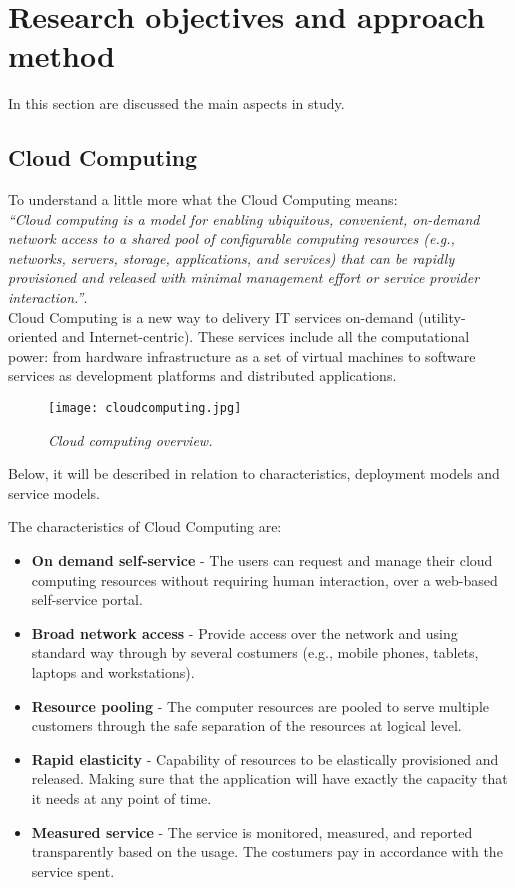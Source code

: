 \newpage
\section{Research objectives and approach method}

In this section are discussed the main aspects in study.

\subsection{Cloud Computing}



To understand a little more what the Cloud Computing means:\\

\textit{``Cloud computing is a model for enabling ubiquitous, convenient, on-demand network access to a shared pool of configurable computing resources (e.g., networks, servers, storage, applications, and services) that can be rapidly provisioned and released with minimal management effort or service provider interaction.''}\cite{mell2011nist}.\\

Cloud Computing is a new way to delivery IT services on-demand (utility-oriented and Internet-centric). These services include all the computational power: from hardware infrastructure as a set of virtual machines to software services as development platforms and distributed applications.

\begin{figure}[!ht]
\begin{center}
\texttt{[image: cloudcomputing.jpg]}
\caption{\small \sl Cloud computing overview.\label{fig:cloudcomputing}}
\end{center}
\end{figure}

Below, it will be described in relation to characteristics, deployment models and service models\cite{schouten2013ibm}.

The characteristics of Cloud Computing are:
\begin{itemize}
	\item \textbf{On demand self-service} 	- The users can request and manage their cloud computing resources without requiring human interaction, over a web-based self-service portal.
	\item \textbf{Broad network access 	}	- Provide access over the network and using standard way through by several costumers (e.g., mobile phones, tablets, laptops and workstations).
	\item \textbf{Resource pooling 		}	- The computer resources are pooled to serve multiple customers through the safe separation of the resources at logical level.
	\item \textbf{Rapid elasticity 		}	- Capability of resources to be elastically provisioned and released. Making sure that the application will have exactly the capacity that it needs at any point of time.
	\item \textbf{Measured service 		}	- The service is monitored, measured, and reported transparently based on the usage. The costumers pay in accordance with the service spent.
\end{itemize}

